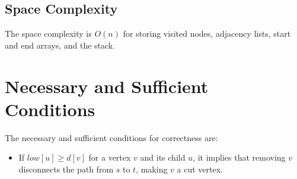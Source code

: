 \documentclass{article}
\begin{document}
    \subsection{Space Complexity}
        The space complexity is $O(n)$ for storing visited nodes, adjacency lists, start and end arrays, and the stack.

\section{Necessary and Sufficient Conditions}
    The necessary and sufficient conditions for correctness are:
    \begin{itemize}
        \item If $low[u] \geq d[v]$ for a vertex $v$ and its child $u$, it implies that removing $v$ disconnects the path from $s$ to $t$, making $v$ a cut vertex.
    \end{itemize}
\end{document}
